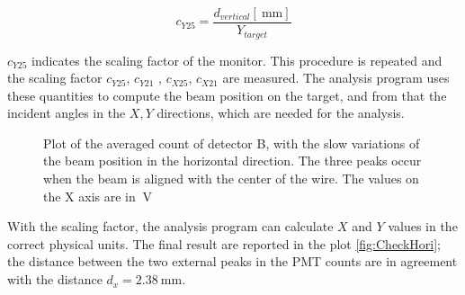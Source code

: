 \begin{equation}
c_{Y25} = \dfrac{d_{vertical} [\SI{}{\milli \meter}]}{ Y_{target}} 
\end{equation}

$c_{Y25}$ indicates the scaling factor of the monitor. This procedure is repeated and the scaling factor $c_{Y25}$, $c_{Y21}$ , $c_{X25}$, $c_{X21}$ are measured. The analysis program uses these quantities to compute the beam position on the target, and from that the incident angles in the $X,Y$ directions, which are needed for the analysis.

\begin{figure}[hbtp]
\centering
{}
\caption{Plot of the averaged count of detector B, with the slow variations of the beam position in the horizontal direction. The three peaks occur when the beam is aligned with the center of the wire. The values on the X axis are in $\SI{}{\volt}$}
\label{fig:HorizontalCalibration}
\end{figure}

With the scaling factor, the analysis program can calculate $X$ and $Y$ values in the correct physical units. The final result are reported in the plot \ref{fig:CheckHori}; the distance between the two external peaks in the PMT counts are in agreement with the distance $d_{x}  = \SI{2.38}{\milli \meter}$.
 
